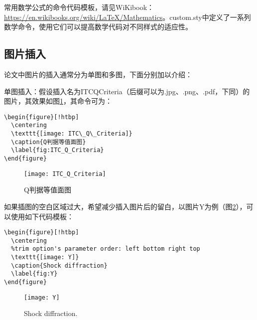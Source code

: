 常用数学公式的命令代码模板，请见WiKibook：\url{https://en.wikibooks.org/wiki/LaTeX/Mathematics}。custom.sty中定义了一系列数学命令，使用它们可以提高数学代码对不同样式的适应性。

\subsection{图片插入}

论文中图片的插入通常分为单图和多图，下面分别加以介绍：

单图插入：假设插入名为ITC\textunderscore Q\textunderscore Criteria（后缀可以为.jpg、.png、.pdf，下同）的图片，其效果如图\ref{fig:ITC_Q_Criteria}，其命令可为：
\begin{verbatim}
\begin{figure}[!htbp]
  \centering
  \texttt{[image: ITC\_Q\_Criteria]}
  \caption{Q判据等值面图}
  \label{fig:ITC_Q_Criteria}
\end{figure}
\end{verbatim}
\begin{figure}[!htbp]
  \centering
  \texttt{[image: ITC\_Q\_Criteria]}
  \caption{Q判据等值面图}
  \label{fig:ITC_Q_Criteria}
\end{figure}

如果插图的空白区域过大，希望减少插入图片后的留白，以图片Y为例（图\ref{fig:Y}），可以使用如下代码模板：
\begin{verbatim}
\begin{figure}[!htbp]
  \centering
  %trim option's parameter order: left bottom right top
  \texttt{[image: Y]}
  \caption{Shock diffraction}
  \label{fig:Y}
\end{figure}
\end{verbatim}
\begin{figure}[!htbp]
  \centering
  \texttt{[image: Y]}
  \caption{Shock diffraction.}
  \label{fig:Y}
\end{figure}

